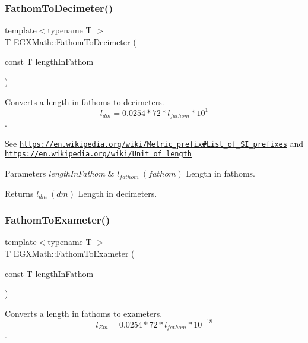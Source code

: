 \subsubsection{\texorpdfstring{Fathom\+To\+Decimeter()}{FathomToDecimeter()}}
{\footnotesize\ttfamily template$<$typename T $>$ \\
T E\+G\+X\+Math\+::\+Fathom\+To\+Decimeter (\begin{DoxyParamCaption}\item[{const T}]{length\+In\+Fathom }\end{DoxyParamCaption})}



Converts a length in fathoms to decimeters. \[ l_{dm}=0.0254 * 72 * l_{fathom} * 10^{1} \]. 

See \href{https://en.wikipedia.org/wiki/Metric_prefix#List_of_SI_prefixes}{\tt https\+://en.\+wikipedia.\+org/wiki/\+Metric\+\_\+prefix\#\+List\+\_\+of\+\_\+\+S\+I\+\_\+prefixes} and \href{https://en.wikipedia.org/wiki/Unit_of_length}{\tt https\+://en.\+wikipedia.\+org/wiki/\+Unit\+\_\+of\+\_\+length} 
\begin{DoxyParams}{Parameters}
{\em length\+In\+Fathom} & $ l_{fathom}\ (fathom)$ Length in fathoms. \\
\hline
\end{DoxyParams}
\begin{DoxyReturn}{Returns}
$ l_{dm}\ (dm)$ Length in decimeters. 
\end{DoxyReturn}
\mbox{\label{group___e_g_x_math-_conversions-_length_conversions-_nautical-_fathom-_s_i_gaf1d241e8c22ec6118c78924886dcd977}} 
\subsubsection{\texorpdfstring{Fathom\+To\+Exameter()}{FathomToExameter()}}
{\footnotesize\ttfamily template$<$typename T $>$ \\
T E\+G\+X\+Math\+::\+Fathom\+To\+Exameter (\begin{DoxyParamCaption}\item[{const T}]{length\+In\+Fathom }\end{DoxyParamCaption})}



Converts a length in fathoms to exameters. \[ l_{Em}=0.0254 * 72 * l_{fathom} * 10^{-18} \]. 

